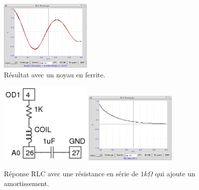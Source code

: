 \documentclass{book}
\begin{document}
\begin{figure}[h!]
\begin{center}
\caption{\label{fig:LCR-response-setup2}Résultat avec un noyau en ferrite. }\vspace{0.5em}
\includegraphics[width=0.4\textwidth, height=0.3\textwidth, keepaspectratio]{Pic-LCRdischarge-ferrite.png}
\end{center}
\end{figure}



\begin{figure}[h!]
\begin{center}
\caption{\label{fig:LCR-response-screen}Réponse RLC avec une résistance en série de $1 k\Omega$  qui ajoute un amortissement. }\vspace{0.5em}
\includegraphics[width=0.4\textwidth, height=0.3\textwidth, keepaspectratio]{Schematic-rlc-tran.png}
\includegraphics[width=0.4\textwidth, height=0.3\textwidth, keepaspectratio]{Pic-LCRdischarge-1k.png}
\end{center}
\end{figure}
\end{document}
